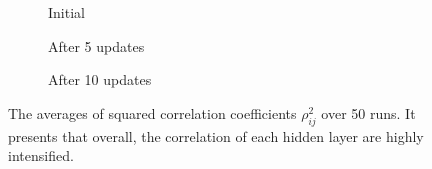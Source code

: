 \begin{figure}
\centering
\newcommand{\myWidth}{0.95\textwidth}
\begin{subfigure}{\myWidth}
  \centering
  \caption{Initial}
  \label{fig:sec5_sim2_a}
\end{subfigure}%

\begin{subfigure}{\myWidth}
  \centering
  \caption{After 5 updates}
  \label{fig:sec5_sim2_b}
\end{subfigure}%

\begin{subfigure}{\myWidth}
  \centering
  \caption{After 10 updates}
  \label{fig:sec5_sim2_c}
\end{subfigure}%
\caption[The averages of squared correlation coefficients $\rho_{ij}^2$ over 50 runs.]
{The averages of squared correlation coefficients $\rho_{ij}^2$ over 50 runs.
It presents that overall, the correlation of each hidden layer are highly intensified.}
\label{fig:sec5_sim2}
\end{figure}
